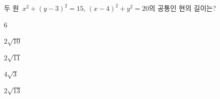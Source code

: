 두 원~$x^2+(y-3)^2=15$, $(x-4)^2+y^2=20$의 공통인 현의 길이는?
\begin{choices32}{\rule[-3ex]{0pt}{8ex}$6$}{\rule[-3ex]{0pt}{8ex}$2\sqrt{10}$}{\rule[-3ex]{0pt}{8ex}$2\sqrt{11}$}{\rule[-3ex]{0pt}{8ex}$4\sqrt{3}$}{\rule[-3ex]{0pt}{8ex}$2\sqrt{13}$}\end{choices32}
